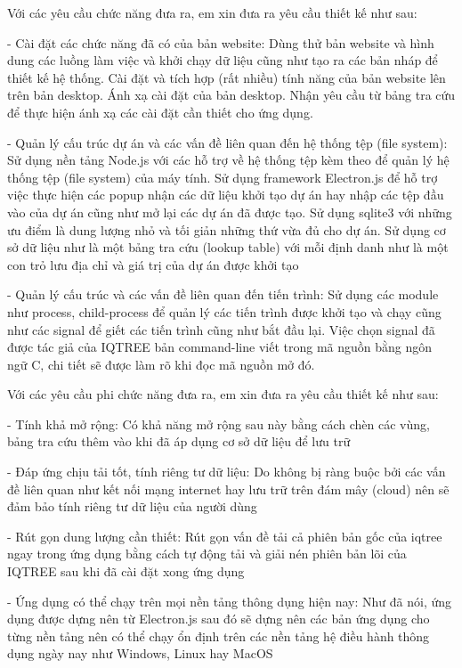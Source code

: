 \documentclass[12pt]{report}
\begin{document}
Với các yêu cầu chức năng đưa ra, em xin đưa ra yêu cầu thiết kế như sau:

- Cài đặt các chức năng đã có của bản website: Dùng thử bản website và hình dung các luồng làm việc và khởi chạy dữ liệu cũng như tạo ra các bản nháp để thiết kế hệ thống. Cài đặt và tích hợp (rất nhiều) tính năng của bản website lên trên bản desktop. Ánh xạ cài đặt của bản desktop. Nhận yêu cầu từ bảng tra cứu để thực hiện ánh xạ các cài đặt cần thiết cho ứng dụng.

- Quản lý cấu trúc dự án và các vấn đề liên quan đến hệ thống tệp (file system): Sử dụng nền tảng Node.js với các hỗ trợ về hệ thống tệp kèm theo để quản lý hệ thống tệp (file system) của máy tính. Sử dụng framework Electron.js để hỗ trợ việc thực hiện các popup nhận các dữ liệu khởi tạo dự án hay nhập các tệp đầu vào của dự án cũng như mở lại các dự án đã được tạo. Sử dụng sqlite3 với những ưu điểm là dung lượng nhỏ và tối giản những thứ vừa đủ cho dự án. Sử dụng cơ sở dữ liệu như là một bảng tra cứu (lookup table) với mỗi định danh như là một con trỏ lưu địa chỉ và giá trị của dự án được khởi tạo

- Quản lý cấu trúc và các vấn đề liên quan đến tiến trình: Sử dụng các module như process, child-process để quản lý các tiến trình được khởi tạo và chạy cũng như các signal để giết các tiến trình cũng như bắt đầu lại. Việc chọn signal đã được tác giả của IQTREE bản command-line viết trong mã nguồn bằng ngôn ngữ C, chi tiết sẽ được làm rõ khi đọc mã nguồn mở đó.

Với các yêu cầu phi chức năng đưa ra, em xin đưa ra yêu cầu thiết kế như sau:

- Tính khả mở rộng: Có khả năng mở rộng sau này bằng cách chèn các vùng, bảng tra cứu thêm vào khi đã áp dụng cơ sở dữ liệu để lưu trữ

- Đáp ứng chịu tải tốt, tính riêng tư dữ liệu: Do không bị ràng buộc bởi các vấn đề liên quan như kết nối mạng internet hay lưu trữ trên đám mây (cloud) nên sẽ đảm bảo tính riêng tư dữ liệu của người dùng

- Rút gọn dung lượng cần thiết: Rút gọn vấn đề tải cả phiên bản gốc của iqtree ngay trong ứng dụng bằng cách tự động tải và giải nén phiên bản lõi của IQTREE sau khi đã cài đặt xong ứng dụng

- Ứng dụng có thể chạy trên mọi nền tảng thông dụng hiện nay: Như đã nói, ứng dụng được dựng nên từ Electron.js sau đó sẽ dựng nên các bản ứng dụng cho từng nền tảng nên có thể chạy ổn định trên các nền tảng hệ điều hành thông dụng ngày nay như Windows, Linux hay MacOS
\end{document}

